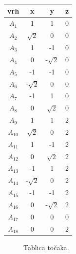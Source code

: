 \documentclass[a4paper,12pt]{article}
\begin{document}
\begin{center}
    \renewcommand{\arraystretch}{0.7}
    \begin{tabular}{||c | c | c | c ||} 
     \hline
     vrh & x & y & z \\ [0.5ex] 
     \hline
     $A_1$ & 1 & 1 & 0  \\ 
     \hline
     $A_2$ & $\sqrt{2}$ & 0 & 0  \\
     \hline
     $A_3$ & 1 & -1 & 0  \\
     \hline
     $A_4$ & 0 & -$\sqrt{2}$ & 0 \\
     \hline
     $A_5$ & -1 & -1 & 0  \\ 
     \hline
     $A_6$ & -$\sqrt{2}$ & 0 & 0  \\
     \hline
     $A_7$ & -1 & 1 & 0  \\
     \hline
     $A_8$ & 0  & $\sqrt{2}$ & 0 \\
     \hline
     $A_9$ & 1 & 1 & 2  \\
     \hline
     $A_{10}$& $\sqrt{2}$ & 0 & 2 \\
     \hline
     $A_{11}$ & 1 & -1 & 2  \\
     \hline
     $A_{12}$ & 0 & $\sqrt{2}$ & 2 \\
     \hline
     $A_{13}$ & -1 & 1 & 2  \\ 
     \hline
     $A_{14}$ & -$\sqrt{2}$ & 0 & 2  \\
     \hline
     $A_{15}$ & -1 & -1 & 2  \\
     \hline
     $A_{16}$ & 0 & -$\sqrt{2}$ & 2  \\
     \hline
     $A_{17}$ & 0  & 0 & 0 \\
     \hline
     $A_{18}$ & 0 & 0  & 2\\ [1ex] 
     \hline
    \end{tabular}
    \end{center}

    \begin{figure}[ht]
        \centering
        \caption{Tablica točaka.}
    \end{figure}
\end{document}
